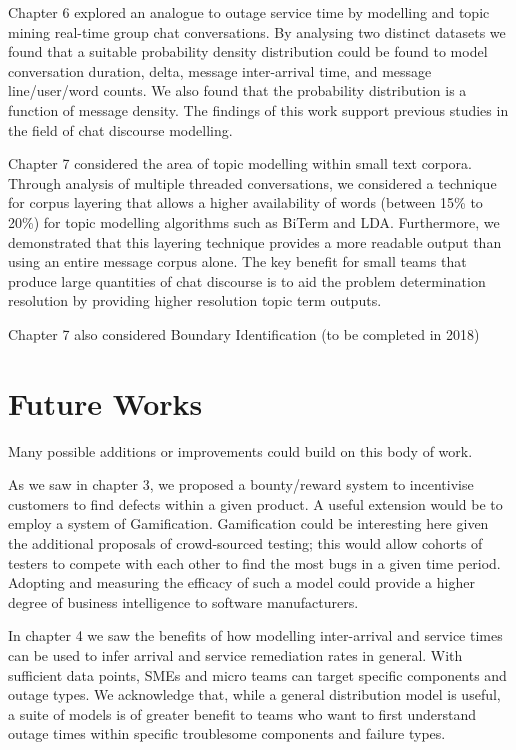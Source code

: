 Chapter 6 explored an analogue to outage service time by modelling and topic mining real-time group chat conversations. By analysing two distinct datasets we found that a suitable probability density distribution could be found to model conversation duration, delta, message inter-arrival time, and message line/user/word counts. We also found that the probability distribution is a function of message density. The findings of this work support previous studies in the field of chat discourse modelling. 

Chapter 7 considered the area of topic modelling within small text corpora. Through analysis of multiple threaded conversations, we considered a technique for corpus layering that allows a higher availability of words (between 15\% to 20\%) for topic modelling algorithms such as BiTerm and LDA. Furthermore, we demonstrated that this layering technique provides a more readable output than using an entire message corpus alone. The key benefit for small teams that produce large quantities of chat discourse is to aid the problem determination resolution by providing higher resolution topic term outputs.

Chapter 7 also considered Boundary Identification (to be completed in 2018)


\section{Future Works}

Many possible additions or improvements could build on this body of work.

As we saw in chapter 3, we proposed a bounty/reward system to incentivise customers to find defects within a given product. A useful extension would be to employ a system of Gamification\cite{huotari2012defining}. Gamification could be interesting here given the additional proposals of crowd-sourced testing; this would allow cohorts of testers to compete with each other to find the most bugs in a given time period. Adopting and measuring the efficacy of such a model could provide a higher degree of business intelligence to software manufacturers.

In chapter 4 we saw the benefits of how modelling inter-arrival and service times can be used to infer arrival and service remediation rates in general. With sufficient data points, SMEs and micro teams can target specific components and outage types. We acknowledge that, while a general distribution model is useful, a suite of models is of greater benefit to teams who want to first understand outage times within specific troublesome components and failure types.

